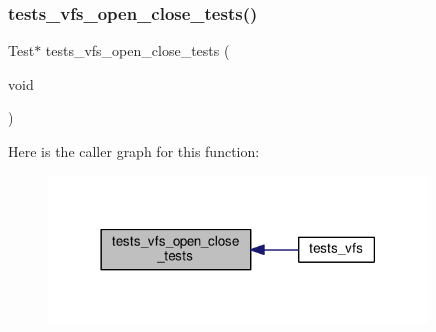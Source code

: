 \subsubsection{\texorpdfstring{tests\+\_\+vfs\+\_\+open\+\_\+close\+\_\+tests()}{tests\_vfs\_open\_close\_tests()}}
{\footnotesize\ttfamily Test$\ast$ tests\+\_\+vfs\+\_\+open\+\_\+close\+\_\+tests (\begin{DoxyParamCaption}\item[{void}]{ }\end{DoxyParamCaption})}

Here is the caller graph for this function\+:
\nopagebreak
\begin{figure}[H]
\begin{center}
\leavevmode
\includegraphics[width=285pt]{tests-vfs_8c_a1431c12e4a6d8b993b1c7ca0c93f9b26_icgraph}
\end{center}
\end{figure}
